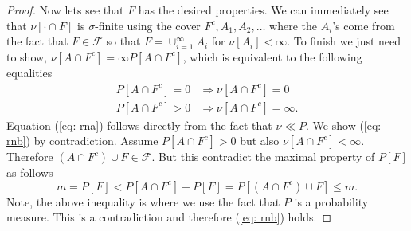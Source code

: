 \begin{proof}
Now lets see that $F$ has the desired properties. We can immediately see that $\nu[\cdot \cap F]$ is $\sigma$-finite using the cover $F^c, A_1, A_2,\ldots$ where the $A_i$'s come from the fact that $F\in\mathcal F$ so that  $F=\cup_{i=1}^\infty A_i$ for $\nu[A_i]<\infty$. To finish we just need to show, $\nu[A \cap F^c] = \infty P[A\cap F^c]$, which is equivalent to the following  equalities
\begin{align}
\label{eq: rna} P[A\cap F^c] = 0 &\Longrightarrow \nu[A\cap F^c]=0 \\
\label{eq: rnb} P[A\cap F^c] > 0 &\Longrightarrow \nu[A\cap F^c]=\infty.
\end{align}
Equation (\ref{eq: rna}) follows directly from the fact that $\nu \ll P$. We show  (\ref{eq: rnb}) by contradiction. Assume $P[A\cap F^c] > 0$ but also $\nu[A\cap F^c]<\infty$. Therefore $(A\cap F^c) \cup F \in \mathcal F$. But this contradict the maximal property of $P[F]$ as follows
\[m = P[F] < P[A\cap F^c] +  P[F]  = P[(A\cap F^c) \cup F] \leq m.  \]
Note, the above inequality is where we use the fact that $P$ is a probability measure.
This is a contradiction and therefore (\ref{eq: rnb}) holds.
\end{proof}


